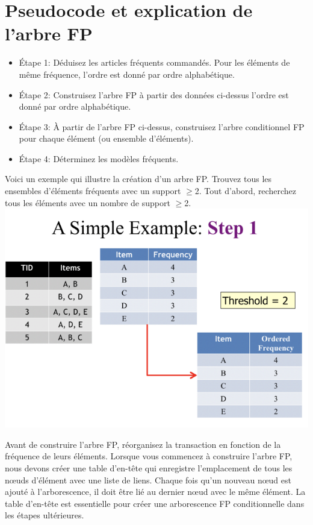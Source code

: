 \documentclass[a4paper,12pt]{article}
\begin{document}
\section{Pseudocode et explication de l'arbre FP}
\begin{itemize}
    \item Étape 1: Déduisez les articles fréquents commandés. Pour les éléments de même fréquence, l'ordre est donné par ordre alphabétique.
    \item Étape 2: Construisez l'arbre FP à partir des données ci-dessus l'ordre est donné par ordre alphabétique.
    \item Étape 3: À partir de l'arbre FP ci-dessus, construisez l'arbre conditionnel FP pour chaque élément (ou ensemble d'éléments).
    \item Étape 4: Déterminez les modèles fréquents.
\end{itemize}

Voici un exemple qui illustre la création d’un arbre FP. Trouvez tous les ensembles d'éléments
fréquents avec un support  $\geq$2. Tout d'abord, recherchez tous les éléments avec un nombre de support $\geq$2.\\
\includegraphics[width=\textwidth]{one}
\pagebreak

Avant de construire l'arbre FP, réorganisez la transaction en fonction de la fréquence de leurs éléments. Lorsque vous commencez à construire l'arbre FP, nous devons créer une table d'en-tête qui enregistre l'emplacement de tous les nœuds d'élément avec une liste de liens. Chaque fois qu'un nouveau nœud est ajouté à l'arborescence, il doit être lié au dernier nœud avec le même élément. La table d'en-tête est essentielle pour créer une arborescence FP conditionnelle dans les étapes ultérieures.\\
\begin{frame}
    {}

\end{frame}
\end{document}
